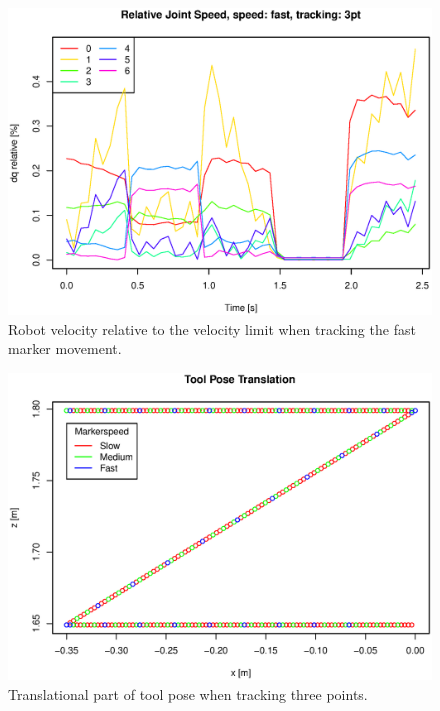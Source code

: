 \begin{figure}[H]
\centering
\includegraphics[width= \fullImageWidth]{graphics/robotics/relativeConfVel_fast_3pt}
\caption{Robot velocity relative to the velocity limit when tracking the fast marker movement.}
\label{fig:robotspeed_fast_3p}
\end{figure}


\begin{figure}[H]
\centering
\includegraphics[width= \fullImageWidth]{graphics/robotics/toolPose_3pt_pos}
\caption{Translational part of tool pose when tracking three points.}
\label{fig:toolpose_3p_pos}
\end{figure}


